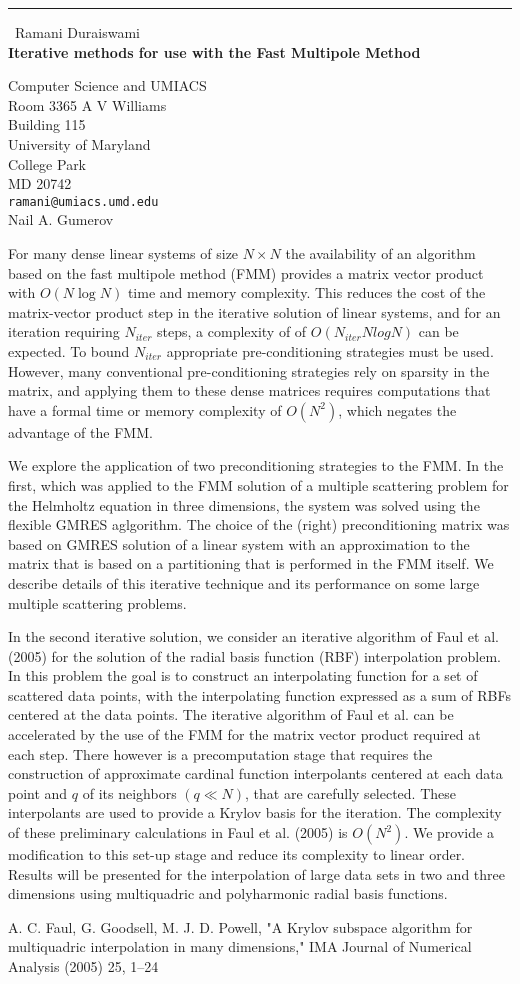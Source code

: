 \documentclass{report}
\begin{document}
\begin{center}
\rule{6in}{1pt} \
{\large Ramani Duraiswami \\
{\bf Iterative methods for use with the Fast Multipole Method}}

Computer Science and UMIACS \\ Room 3365 A V Williams \\ Building 115 \\ University of Maryland \\ College Park \\ MD 20742
\\
{\tt ramani@umiacs.umd.edu}\\
Nail A. Gumerov\end{center}

For many dense linear systems of size $N\times N$ the availability of an
algorithm based on the fast multipole method (FMM) provides a matrix
vector product with $O(N \log N)$ time and memory complexity. This
reduces the cost of the matrix-vector product step in the iterative
solution of linear systems, and for an iteration requiring $N_{iter}$
steps, a complexity of of $O(N_{iter}NlogN)$ can be expected. To bound
$N_{iter}$ appropriate pre-conditioning strategies must be used. However,
many conventional pre-conditioning strategies rely on sparsity in the
matrix, and applying them to these dense matrices requires computations
that have a formal time or memory complexity of $O(N^2)$, which negates
the advantage of the FMM.

We explore the application of two preconditioning strategies to the FMM.
In the first, which was applied to the FMM solution of a multiple
scattering problem for the Helmholtz equation in three dimensions, the
system was solved using the flexible GMRES aglgorithm. The choice of the
(right) preconditioning matrix was based on GMRES solution of a linear
system with an approximation to the matrix that is based on a
partitioning that is performed in the FMM itself. We describe details of
this iterative technique and its performance on some large multiple
scattering problems.

In the second iterative solution, we consider an iterative algorithm of
Faul et al. (2005) for the solution of the radial basis function (RBF)
interpolation problem. In this problem the goal is to construct an
interpolating function for a set of scattered data points, with the
interpolating function expressed as a sum of RBFs centered at the data
points. The iterative algorithm of Faul et al. can be accelerated by the
use of the FMM for the matrix vector product required at each step. There
however is a precomputation stage that requires the construction of
approximate cardinal function interpolants centered at each data point
and $q$ of its neighbors $(q\ll N)$, that are carefully selected. These
interpolants are used to provide a Krylov basis for the iteration. The
complexity of these preliminary calculations in Faul et al. (2005) is
$O(N^2)$. We provide a modification to this set-up stage and reduce its
complexity to linear order. Results will be presented for the
interpolation of large data sets in two and three dimensions using
multiquadric and polyharmonic radial basis functions.

A. C. Faul, G. Goodsell, M. J. D. Powell, "A Krylov subspace algorithm
for multiquadric interpolation in many dimensions," IMA Journal of
Numerical Analysis (2005) 25, 1--24
\end{document}
